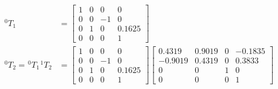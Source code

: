 \begin{equation*}
    \begin{split}
        ^{0}T_{1}                                                 & = \begin{bmatrix}
                                                                          1 & 0 & 0  & 0      \\
                                                                          0 & 0 & -1 & 0      \\
                                                                          0 & 1 & 0  & 0.1625 \\
                                                                          0 & 0 & 0  & 1
                                                                      \end{bmatrix}                                             \\
        ^{0}T_{2} = \hspace{1pt} ^{0}T_{1} \hspace{1pt} ^{1}T_{2} & =                     \begin{bmatrix}
                                                                                              1 & 0 & 0  & 0      \\
                                                                                              0 & 0 & -1 & 0      \\
                                                                                              0 & 1 & 0  & 0.1625 \\
                                                                                              0 & 0 & 0  & 1
                                                                                          \end{bmatrix}\begin{bmatrix}
                                                                                                           0.4319  & 0.9019 & 0 & -0.1835 \\
                                                                                                           -0.9019 & 0.4319 & 0 & 0.3833  \\
                                                                                                           0       & 0      & 1 & 0       \\
                                                                                                           0       & 0      & 0 & 1

\end{bmatrix}
\end{split}
\end{equation*}
